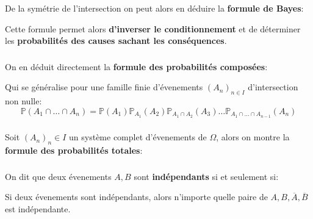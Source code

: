 De la symétrie de l'intersection on peut alors en déduire la \textbf{formule de Bayes}:

Cette formule permet alors \textbf{d'inverser le conditionnement} et de déterminer les \textbf{probabilités des causes sachant les conséquences}.

\subsection*{}
On en déduit directement la \textbf{formule des probabilités composées}:

Qui se généralise pour une famille finie d'évenements \((A_n)_{n \in I}\) d'intersection non nulle:
\[
   \mathbb{P}(A_1 \cap \ldots \cap A_n) = \mathbb{P}(A_1)\mathbb{P}_{A_1}(A_2)\mathbb{P}_{A_1\cap A_2}(A_3)\ldots\mathbb{P}_{A_1\cap \ldots \cap A_{n-1}}(A_n)
\]

\subsection*{}
Soit \((A_n)_n \in I\) un système complet d'évenements de \(\Omega\), alors on montre la \textbf{formule des probabilités totales}:


\subsection*{}
On dit que deux évenements \(A, B\) sont \textbf{indépendants} si et seulement si:

Si deux évenements sont indépendants, alors n'importe quelle paire de \(A, B, \overline{A}, \overline{B}\) est indépendante.

\chapter*{} %

